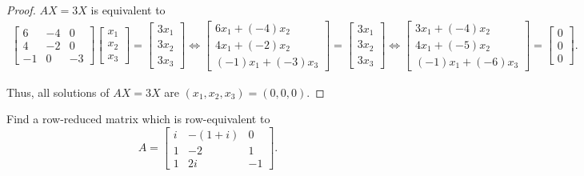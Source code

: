 \begin{proof}
    $AX = 3X$ is equivalent to
    \begin{align*}
        \begin{bmatrix}
            6  & -4 & 0  \\
            4  & -2 & 0  \\
            -1 & 0  & -3
        \end{bmatrix}
        \begin{bmatrix}
            x_{1} \\ x_{2} \\ x_{3}
        \end{bmatrix}
        =
        \begin{bmatrix}
            3x_{1} \\ 3x_{2} \\ 3x_{3}
        \end{bmatrix}
        \Longleftrightarrow
        \begin{bmatrix}
            6x_{1} + (-4)x_{2} \\ 4x_{1} + (-2)x_{2} \\ (-1)x_{1} + (-3)x_{3}
        \end{bmatrix}
        =
        \begin{bmatrix}
            3x_{1} \\ 3x_{2} \\ 3x_{3}
        \end{bmatrix}
        \Longleftrightarrow
        \begin{bmatrix}
            3x_{1} + (-4)x_{2} \\
            4x_{1} + (-5)x_{2} \\
            (-1)x_{1} + (-6)x_{3}
        \end{bmatrix}
        =
        \begin{bmatrix}
            0 \\ 0 \\ 0
        \end{bmatrix}.
    \end{align*}

    Thus, all solutions of $AX = 3X$ are $(x_{1}, x_{2}, x_{3}) = (0, 0, 0)$.
\end{proof}

\begin{exercise}
    Find a row-reduced matrix which is row-equivalent to
    \[
        A =
        \begin{bmatrix}
            i & -(1 + i) & 0  \\
            1 & -2       & 1  \\
            1 & 2i       & -1
        \end{bmatrix}.
    \]
\end{exercise}

